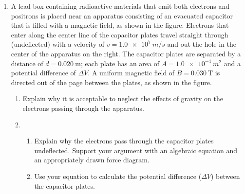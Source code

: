 \documentclass{../../oss-apphys}
\begin{document}
\begin{enumerate}[leftmargin=15pt]

\item A lead box containing radioactive materials that emit both electrons and
  positrons is placed near an apparatus consisting of an evacuated capacitor
  that is filled with a magnetic field, as shown in the figure. Electrons that
  enter along the center line of the capacitor plates travel straight through
  (undeflected) with a velocity of $v=\SI{1.0e7}{m/s}$ and out
  the hole in the center of the apparatus on the right. The capacitor plates
  are separated by a distance of $d=\SI{0.020}{\metre}$; each plate has an area
  of $A=\SI{1.0e-4}{m^2}$ and a potential difference of $\Delta V$. A uniform
  magnetic field of $B=\SI{0.030}{\tesla}$ is directed out of the page between
  the plates, as shown in the figure.

  \vspace{-.2in}
  \begin{center}
  \end{center}

  \begin{enumerate}[noitemsep]
  \item\vspace{-.2in} Explain why it is acceptable to neglect the effects of
    gravity on the electrons passing through the apparatus.
  \item
    \begin{enumerate}
    \item Explain why the electrons pass through the capacitor plates
      undeflected. Support your argument with an algebraic equation
      and an appropriately drawn force diagram.

    \item Use your equation to calculate the potential difference ($\Delta V$)
      between the capacitor plates.


\end{enumerate}
\end{enumerate}
\end{enumerate}
\end{document}
